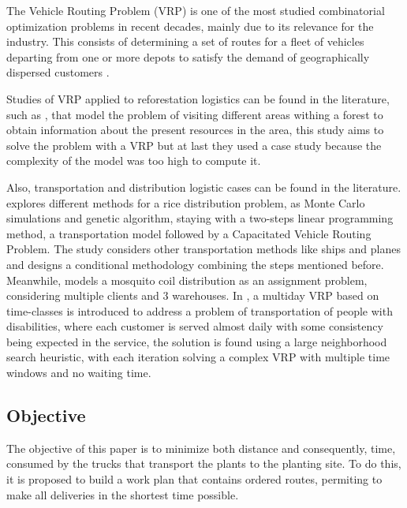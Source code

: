 \documentclass{amsart}
\begin{document}
         The Vehicle Routing Problem (VRP) is one of the most studied combinatorial optimization problems in recent decades, mainly due to its relevance for the industry. This consists of determining a set of routes for a fleet of vehicles departing from one or more depots to satisfy the demand of geographically dispersed customers \parencite{Sarmiento2014}.
         
         Studies of VRP applied to reforestation logistics can be found in the literature, such as \cite{VRPReforestation}, that model the problem of visiting different areas withing a forest to obtain information about the present resources in the area, this study aims to solve the problem with a VRP but at last they used a case study because the complexity of the model was too high to compute it. 
         
         Also, transportation and distribution logistic cases can be found in the literature. \cite{Nurprihatin2021} explores different methods for a rice distribution problem, as Monte Carlo simulations and genetic algorithm, staying with a two-steps linear programming method, a transportation model followed by a Capacitated Vehicle Routing Problem. The study considers other transportation methods like ships and planes and designs a conditional methodology combining the steps mentioned before. Meanwhile, \cite{Khan2014} models a mosquito coil distribution as an assignment problem, considering multiple clients and 3 warehouses. In \cite{Feillet2014}, a multiday VRP based on time-classes is introduced to address a problem of transportation of people with disabilities, where each customer is served almost daily with some consistency being expected in the service, the solution is found using a large neighborhood search heuristic, with each iteration solving a complex VRP with multiple time windows and no waiting time.


        \subsection{Objective}        
        The objective of this paper is to minimize both distance and consequently, time, consumed by the trucks that transport the plants to the planting site. To do this, it is proposed to build a work plan that contains ordered routes, permiting to make all deliveries in the shortest time possible.
        



\end{document}
